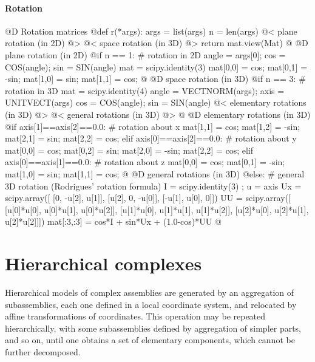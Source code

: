 \documentclass[11pt,oneside]{article}	%
\begin{document}
\paragraph{Rotation}
@D Rotation matrices
@{def r(*args): 
	args = list(args)
	n = len(args)
	@< plane rotation (in 2D) @>
	@< space rotation (in 3D) @>
	return mat.view(Mat)
@}
@D plane rotation (in 2D)
@{if n == 1: # rotation in 2D
	angle = args[0]; cos = COS(angle); sin = SIN(angle)
	mat = scipy.identity(3)
	mat[0,0] = cos;	mat[0,1] = -sin;
	mat[1,0] = sin;	mat[1,1] = cos;
@}
@D space rotation (in 3D)
@{if n == 3: # rotation in 3D
	mat = scipy.identity(4)
	angle = VECTNORM(args); axis = UNITVECT(args)
	cos = COS(angle); sin = SIN(angle)
	@< elementary rotations (in 3D) @>
	@< general rotations (in 3D) @>
@}
@D elementary rotations (in 3D)
@{if axis[1]==axis[2]==0.0:	# rotation about x
	mat[1,1] = cos;	mat[1,2] = -sin;
	mat[2,1] = sin;	mat[2,2] = cos;
elif axis[0]==axis[2]==0.0:	# rotation about y
	mat[0,0] = cos;	mat[0,2] = sin;
	mat[2,0] = -sin;	mat[2,2] = cos;
elif axis[0]==axis[1]==0.0:	# rotation about z
	mat[0,0] = cos;	mat[0,1] = -sin;
	mat[1,0] = sin;	mat[1,1] = cos;
@}
@D general rotations (in 3D)
@{else:		# general 3D rotation (Rodrigues' rotation formula)	
	I = scipy.identity(3) ; u = axis
	Ux = scipy.array([
		[0,		-u[2], 	 u[1]],
		[u[2],		0, 	-u[0]],
		[-u[1],	 u[0], 		0]])
	UU = scipy.array([
		[u[0]*u[0],	u[0]*u[1],	u[0]*u[2]],
		[u[1]*u[0],	u[1]*u[1],	u[1]*u[2]],
		[u[2]*u[0],	u[2]*u[1],	u[2]*u[2]]])
	mat[:3,:3] = cos*I + sin*Ux + (1.0-cos)*UU
@}


\section{Hierarchical complexes}
Hierarchical models of complex assemblies are generated by an aggregation
of subassemblies, each one defined in a local coordinate system, and
relocated by affine transformations of coordinates.  This operation
may be repeated hierarchically, with some subassemblies defined by
aggregation of simpler parts, and so on, until one obtains a set of
elementary components, which cannot be further decomposed.
\end{document}
